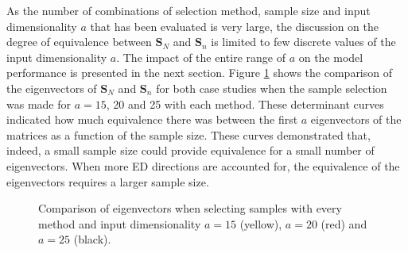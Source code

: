 \documentclass[preprint,12pt]{elsarticle}
\begin{document}
As the number of combinations of selection method, sample size and input dimensionality $a$ that has been evaluated is very large, the discussion on the degree of equivalence between $\mathbf{S}_N$ and $\mathbf{S}_n$ is limited to few discrete values of the input dimensionality $a$. The impact of the entire range of $a$ on the model performance is presented in the next section. Figure \ref{fig_specific_framework_detereigevect} shows the comparison of the eigenvectors of $\mathbf{S}_N$ and $\mathbf{S}_n$ for both case studies when the sample selection was made for $a=15$, 20 and 25 with each method. These determinant curves indicated how much equivalence there was between the first $a$ eigenvectors of the matrices as a function of the sample size. These curves demonstrated that, indeed, a small sample size could provide equivalence for a small number of eigenvectors. When more ED directions are accounted for, the equivalence of the eigenvectors requires a larger sample size. 


\begin{figure}[H]
    \centering
    \caption{Comparison of eigenvectors when selecting samples with every method and input dimensionality $a=15$ (yellow), $a=20$ (red) and $a=25$ (black).}
    \label{fig_specific_framework_detereigevect}
\end{figure}
\end{document}
